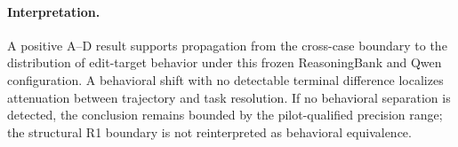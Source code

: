 \paragraph{Interpretation.}
A positive A--D result supports propagation from the cross-case boundary to the
distribution of edit-target behavior under this frozen ReasoningBank and Qwen
configuration. A behavioral shift with no detectable terminal difference localizes
attenuation between trajectory and task resolution. If no behavioral separation is
detected, the conclusion remains bounded by the pilot-qualified precision range;
the structural R1 boundary is not reinterpreted as behavioral equivalence.
